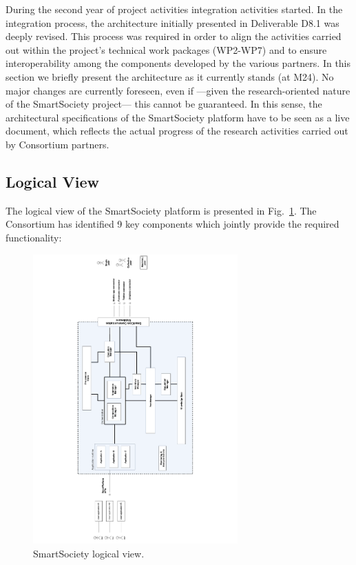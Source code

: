 During the second year of project activities integration activities
started. In the integration process, the architecture initially
presented in Deliverable D8.1 was deeply revised. This process was
required in order to align the activities carried out within the
project's technical work packages (WP2-WP7) and to ensure
interoperability among the components developed by the various
partners. In this section we briefly present the architecture as it
currently stands (at M24). No major changes are currently foreseen,
even if ---given the research-oriented nature of the SmartSociety
project--- this cannot be guaranteed. In this sense, the architectural
specifications of the SmartSociety platform have to be seen as a live document, which reflects the
actual progress of the research activities carried out by Consortium
partners. 

\subsection{Logical View}


The logical view of the SmartSociety platform is presented in Fig.~\ref{fig:logical_view}. The Consortium has identified 9 key
components which jointly provide the required functionality:

\begin{figure}[!hbt]
 \centering
 \includegraphics[width=0.7\textwidth, angle = -90]{figs/logical_view.pdf}
 \caption{SmartSociety logical view.}
 \label{fig:logical_view}
\end{figure}

